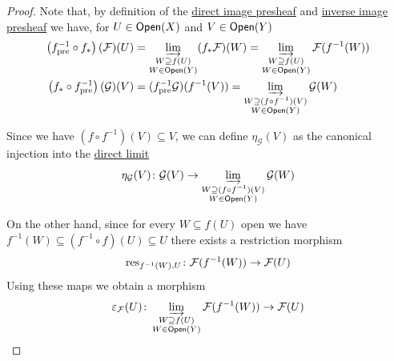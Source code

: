 \documentclass[../../main]{subfiles}
\begin{document}
\begin{proof}
  Note that, by definition of the \hyperref[def:direct-image-sheaf]{direct image presheaf} and \hyperref[def:inverse-image-presheaf]{inverse image presheaf} we have, for \(U \in \mathsf{Open}(X)\) and \(V \in \mathsf{Open}(Y)\)
  \begin{align*}
    \left( f_{\operatorname{pre}}^{-1} \circ f_{\ast} \right)(\mathcal{F})(U) &= \varinjlim_{\substack{W \supseteq f(U) \\ W \in \mathsf{Open}(Y)}} (f_{\ast}\mathcal{F})(W) = \varinjlim_{\substack{W \supseteq f(U) \\ W \in \mathsf{Open}(Y)}} \mathcal{F}(f^{-1}(W)) \\
    \left( f_{\ast} \circ f_{\operatorname{pre}}^{-1} \right)(\mathcal{G})(V) &= (f_{\operatorname{pre}}^{-1}\mathcal{G})(f^{-1}(V)) = \varinjlim_{\substack{W \supseteq (f \circ f^{-1})(V) \\ W \in \mathsf{Open}(Y)}} \mathcal{G}(W) \end{align*}

  Since we have \((f \circ f^{-1})(V) \subseteq V\), we can define \(\eta_{\mathcal{G}}(V)\) as the canonical injection into the \hyperref[def:direct-limit]{direct limit}
  \begin{equation*}
    \eta_{\mathcal{G}}(V)\colon \mathcal{G}(V) \to \varinjlim_{\substack{W \supseteq (f \circ f^{-1})(V) \\ W \in \mathsf{Open}(Y)}} \mathcal{G}(W)
  \end{equation*}

  On the other hand, since for every \(W \subseteq f(U)\) open we have \(f^{-1}(W) \subseteq (f^{-1} \circ f)(U) \subseteq U\) there exists a restriction morphism
  \begin{equation*}
    \operatorname{res}_{f^{-1}(W), U}\colon \mathcal{F}(f^{-1}(W)) \to \mathcal{F}(U)
  \end{equation*}
  Using these maps we obtain a morphism
  \begin{equation*}
    \varepsilon_{\mathcal{F}}(U)\colon \varinjlim_{\substack{W \supseteq f(U) \\ W \in \mathsf{Open}(Y)}} \mathcal{F}(f^{-1}(W)) \to \mathcal{F}(U) \qedhere
  \end{equation*}
\end{proof}
\end{document}
